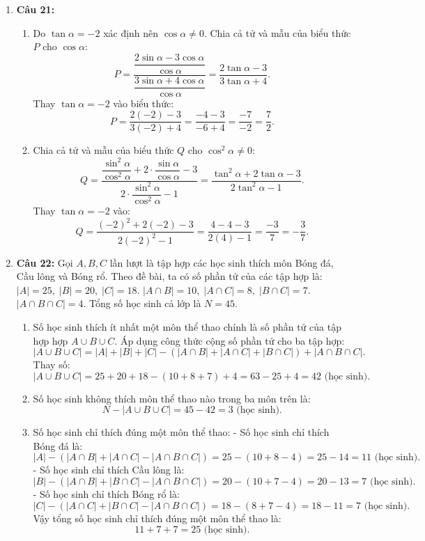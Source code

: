 \documentclass[12pt,a4paper]{article}
\begin{document}
\begin{enumerate}[resume]
\item \textbf{Câu 21:}
\begin{enumerate}
    \item Do $\tan \alpha = -2$ xác định nên $\cos \alpha \ne 0$. Chia cả tử và mẫu của biểu thức $P$ cho $\cos \alpha$:
    \[
    P = \dfrac{\dfrac{2\sin \alpha - 3\cos \alpha}{\cos \alpha}}{\dfrac{3\sin \alpha + 4\cos \alpha}{\cos \alpha}} = \dfrac{2\tan \alpha - 3}{3\tan \alpha + 4}.
    \]
    Thay $\tan \alpha = -2$ vào biểu thức:
    \[
    P = \dfrac{2(-2) - 3}{3(-2) + 4} = \dfrac{-4 - 3}{-6 + 4} = \dfrac{-7}{-2} = \dfrac{7}{2}.
    \]
    \item Chia cả tử và mẫu của biểu thức $Q$ cho $\cos^2 \alpha \ne 0$:
    \[
    Q = \dfrac{\dfrac{\sin^2 \alpha}{\cos^2 \alpha} + 2 \cdot \dfrac{\sin \alpha}{\cos \alpha} - 3}{2 \cdot \dfrac{\sin^2 \alpha}{\cos^2 \alpha} - 1} = \dfrac{\tan^2 \alpha + 2\tan \alpha - 3}{2\tan^2 \alpha - 1}.
    \]
    Thay $\tan \alpha = -2$ vào:
    \[
    Q = \dfrac{(-2)^2 + 2(-2) - 3}{2(-2)^2 - 1} = \dfrac{4 - 4 - 3}{2(4) - 1} = \dfrac{-3}{7} = -\dfrac{3}{7}.
    \]
\end{enumerate}

\item \textbf{Câu 22:}
Gọi $A, B, C$ lần lượt là tập hợp các học sinh thích môn Bóng đá, Cầu lông và Bóng rổ.
Theo đề bài, ta có số phần tử của các tập hợp là:
$|A| = 25,\; |B| = 20,\; |C| = 18$.
$|A \cap B| = 10,\; |A \cap C| = 8,\; |B \cap C| = 7$.
$|A \cap B \cap C| = 4$.
Tổng số học sinh cả lớp là $N = 45$.
\begin{enumerate}
    \item Số học sinh thích ít nhất một môn thể thao chính là số phần tử của tập hợp hợp $A \cup B \cup C$.
    Áp dụng công thức cộng số phần tử cho ba tập hợp:
    \[
    |A \cup B \cup C| = |A| + |B| + |C| - (|A \cap B| + |A \cap C| + |B \cap C|) + |A \cap B \cap C|.
    \]
    Thay số:
    \[
    |A \cup B \cup C| = 25 + 20 + 18 - (10 + 8 + 7) + 4 = 63 - 25 + 4 = 42\text{ (học sinh)}.
    \]
    \item Số học sinh không thích môn thể thao nào trong ba môn trên là:
    \[
    N - |A \cup B \cup C| = 45 - 42 = 3\text{ (học sinh)}.
    \]
    \item Số học sinh chỉ thích đúng một môn thể thao:
    - Số học sinh chỉ thích Bóng đá là:
    \[
    |A| - (|A \cap B| + |A \cap C| - |A \cap B \cap C|) = 25 - (10 + 8 - 4) = 25 - 14 = 11\text{ (học sinh)}.
    \]
    - Số học sinh chỉ thích Cầu lông là:
    \[
    |B| - (|A \cap B| + |B \cap C| - |A \cap B \cap C|) = 20 - (10 + 7 - 4) = 20 - 13 = 7\text{ (học sinh)}.
    \]
    - Số học sinh chỉ thích Bóng rổ là:
    \[
    |C| - (|A \cap C| + |B \cap C| - |A \cap B \cap C|) = 18 - (8 + 7 - 4) = 18 - 11 = 7\text{ (học sinh)}.
    \]
    Vậy tổng số học sinh chỉ thích đúng một môn thể thao là:
    \[
    11 + 7 + 7 = 25\text{ (học sinh)}.
    \]
\end{enumerate}
\end{enumerate}
\end{document}
